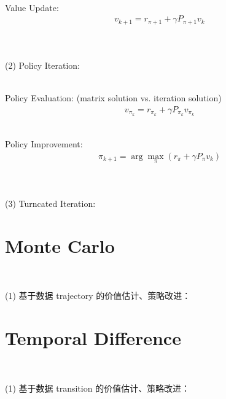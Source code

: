 \documentclass{article}
\begin{document}
~ \\[3pt]
Value Update: 
\begin{align*}
    v_{k+1} = r_{\pi+1} + \gamma P_{\pi+1} v_{k} 
\end{align*}


~ \\[3pt]
~ \\[3pt]
(2) Policy Iteration: 

~ \\[3pt]
Policy Evaluation: (matrix solution vs. iteration solution)
\begin{align*}
    v_{\pi_{k}} = r_{\pi_{k}} + \gamma P_{\pi_{k}} v_{\pi_{k}}
\end{align*}

~ \\[3pt]
Policy Improvement: 
\begin{align*}
    \pi_{k+1} = \arg \max_{\pi} 
    \left( r_{\pi} + \gamma P_{\pi} v_{k} \right) 
\end{align*}


~ \\[3pt]
~ \\[3pt]
(3) Turncated Iteration: 



\newpage
\section{Monte Carlo}


~ \\[3pt]
\begin{CJK}{UTF8}{gbsn}
    (1) 基于数据 trajectory 的价值估计、策略改进： \\[3pt]
\end{CJK}

\section{Temporal Difference}


~ \\[3pt]
\begin{CJK}{UTF8}{gbsn}
    (1) 基于数据 transition 的价值估计、策略改进： \\[3pt]
\end{CJK}
\end{document}
